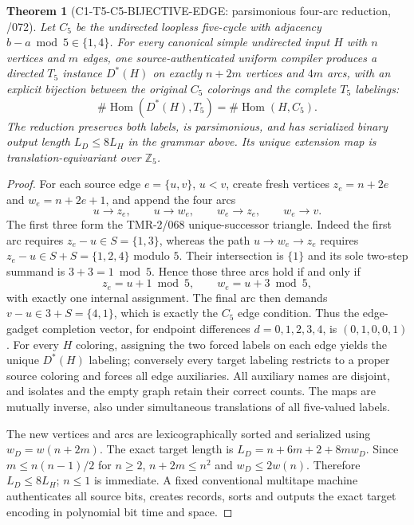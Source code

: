 \documentclass[11pt]{article}
\newtheorem{theorem}{Theorem}
\begin{document}
\begin{theorem}[C1-T5-C5-BIJECTIVE-EDGE: parsimonious four-arc reduction, /072]
Let $C_5$ be the undirected loopless five-cycle with adjacency
$b-a\bmod5\in\{1,4\}$. For every canonical simple undirected input
$H$ with $n$ vertices and $m$ edges, one source-authenticated uniform
compiler produces a directed $T_5$ instance $D^*(H)$ on exactly
$n+2m$ vertices and $4m$ arcs, with an explicit bijection between
the original $C_5$ colorings and the complete $T_5$ labelings:
\[
 \boxed{\#\operatorname{Hom}(D^*(H),T_5)
 =\#\operatorname{Hom}(H,C_5).}
\]
The reduction preserves both labels, is \emph{parsimonious}, and has
serialized binary output length $L_D\le8L_H$ in the grammar above.
Its unique extension map is translation-equivariant over $\mathbb Z_5$.
\end{theorem}
\begin{proof}
For each source edge $e=\{u,v\}$, $u<v$, create fresh vertices
$z_e=n+2e$ and $w_e=n+2e+1$, and append the four arcs
\[
  u\to z_e,\qquad u\to w_e,\qquad w_e\to z_e,
  \qquad w_e\to v.
\]
The first three form the TMR-2/068 unique-successor triangle.
Indeed the first arc requires $z_e-u\in S=\{1,3\}$,
whereas the path $u\to w_e\to z_e$ requires
$z_e-u\in S+S=\{1,2,4\}$ modulo $5$.
Their intersection is $\{1\}$ and its sole two-step summand
is $3+3=1\bmod5$. Hence those three arcs hold if and only if
\[
 z_e=u+1\bmod5,\qquad w_e=u+3\bmod5,
\]
with exactly one internal assignment. The final arc then demands
$v-u\in3+S=\{4,1\}$, which is exactly the $C_5$ edge condition.
Thus the edge-gadget completion vector, for endpoint differences
$d=0,1,2,3,4$, is $(0,1,0,0,1)$.
For every $H$ coloring, assigning the two forced labels on
each edge yields the unique $D^*(H)$ labeling; conversely every
target labeling restricts to a proper source coloring and forces
all edge auxiliaries. All auxiliary names are disjoint, and
isolates and the empty graph retain their correct counts.
The maps are mutually inverse, also under simultaneous translations
of all five-valued labels.

The new vertices and arcs are lexicographically sorted and
serialized using $w_D=w(n+2m)$. The exact target length is
$L_D=n+6m+2+8mw_D$. Since $m\le n(n-1)/2$ for $n\ge2$,
$n+2m\le n^2$ and $w_D\le2w(n)$.
Therefore $L_D\le8L_H$; $n\le1$ is immediate.
A fixed conventional multitape machine authenticates all source
bits, creates records, sorts and outputs the exact target encoding
in polynomial bit time and space.
\end{proof}
\end{document}
